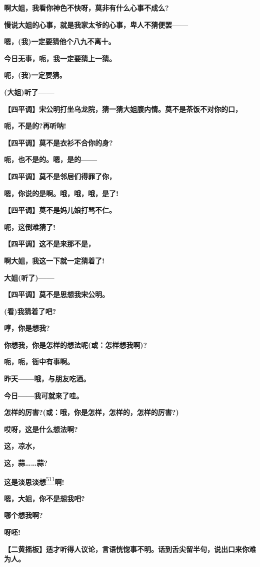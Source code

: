 \textbf{啊大姐，我看你神色不快呀，莫非有什么心事不成么?}

\textbf{慢说大姐的心事，就是我家太爷的心事，卑人不猜便罢------}

\textbf{嗯，(我)一定要猜他个八九不离十。}

\textbf{今日无事，呃，我一定要猜上一猜。}

\textbf{呃，(我)一定要猜。}

\textbf{(大姐)听了------}

\textbf{【四平调】宋公明打坐乌龙院，猜一猜大姐腹内情。莫不是茶饭不对你的口，}

\textbf{呃，不是的?再听呐!}

\textbf{【四平调】莫不是衣衫不合你的身?}

\textbf{呃，也不是的。嗯，是的------}

\textbf{【四平调】莫不是邻居们得罪了你，}

\textbf{嗯，你说的是啊。哦，哦，哦，是了!}

\textbf{【四平调】莫不是妈儿娘打骂不仁。}

\textbf{呃，这倒难猜了!}

\textbf{【四平调】这不是来那不是，}

\textbf{啊大姐，我这一下就一定猜着了!}

\textbf{大姐(听了)------}

\textbf{【四平调】莫不是思想我宋公明。}

\textbf{(看)我猜着了吧?}

\textbf{哼，你是想我?}

\textbf{你想我，你是怎样的想法呢(或：怎样想我啊)?}

\textbf{呃，呃，衙中有事啊。}

\textbf{昨天------哦，与朋友吃酒。}

\textbf{今日------我可就来了哇。}

\textbf{怎样的厉害?(或：哦，你是怎样，怎样的，怎样的厉害?)}

\textbf{哎呀，这是什么想法啊?}

\textbf{这，凉水，}

\textbf{这，蒜\ldots{}\ldots{}蒜?}

\textbf{这是淡思淡想}\protect\hyperlink{fn511}{\textsuperscript{511}}\textbf{啊!}

\textbf{嗯，大姐，你不是想我吧?}

\textbf{哪个想我啊?}

\textbf{呀呸!}

\textbf{【二黄摇板】适才听得人议论，言语恍惚事不明。话到舌尖留半句，说出口来你难为人。}

